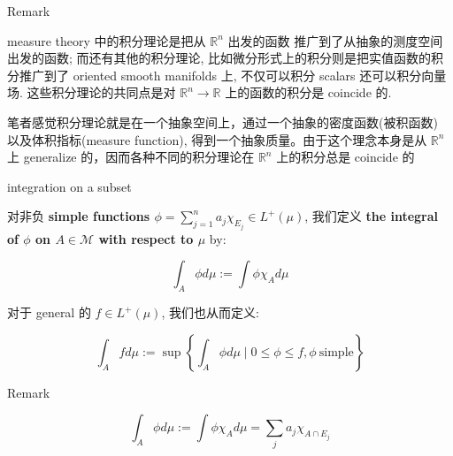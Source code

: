 \documentclass{qlnotes-export}
\begin{document}
\begin{qlremark}{Remark}

measure theory 中的积分理论是把从 \({\mathbb{R}}^{n}\) 出发的函数 推广到了从抽象的测度空间出发的函数; 而还有其他的积分理论, 比如微分形式上的积分则是把实值函数的积分推广到了 oriented smooth manifolds 上, 不仅可以积分 scalars 还可以积分向量场. 这些积分理论的共同点是对 \({\mathbb{R}}^{n}\rightarrow{\mathbb{R}}\) 上的函数的积分是 coincide 的.

笔者感觉积分理论就是在一个抽象空间上，通过一个抽象的密度函数(被积函数) 以及体积指标(measure function), 得到一个抽象质量。由于这个理念本身是从 \({\mathbb{R}}^{n}\) 上 generalize 的，因而各种不同的积分理论在 \({\mathbb{R}}^{n}\) 上的积分总是 coincide 的

\end{qlremark}

\begin{definition}{integration on a subset}\label{def-04-measurable-functions-and-integration-on-l-mu-integration-on-a-subset}

对非负 \textbf{simple functions \(\phi = \sum_{j = 1}^{n}a_{j}\chi_{E_{j}} \in L^{+}(\mu)\)}, 我们定义 \textbf{the integral of \(\phi\) on \(A \in \mathcal{M}\) with respect to \(\mu\)} by:

\[\int_{A}\phi d\mu := \int\phi\chi_{A} d\mu\]

对于 general 的 \(f \in L^{+}(\mu)\), 我们也从而定义:

\[\int_{A}fd\mu := \sup\left\{ {\int_{A}\phi d\mu \mid 0 \leq \phi \leq f,\phi\ \text{simple}} \right\}\]

\end{definition}

\begin{qlremark}{Remark}

\[\int_{A}\phi d\mu := \int\phi\chi_{A} d\mu = \sum\limits_{j}a_{j}\chi_{A \cap E_{j}}\]

\end{qlremark}
\end{document}
